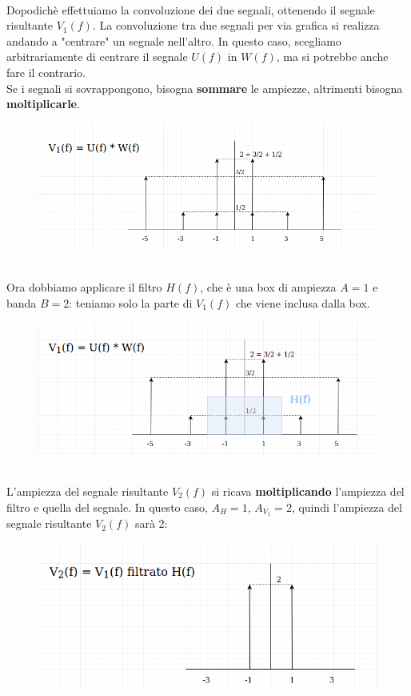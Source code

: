 \documentclass[12pt,a4paper]{article}
\begin{document}
	\\Dopodich\`e effettuiamo la convoluzione dei due segnali, ottenendo il segnale risultante $V_1(f)$. La convoluzione tra due segnali per via grafica si realizza andando a "centrare" un segnale nell'altro. In questo caso, scegliamo arbitrariamente di centrare il segnale $U(f)$ in $W(f)$, ma si potrebbe anche fare il contrario.\\Se i segnali si sovrappongono, bisogna \textbf{sommare} le ampiezze, altrimenti bisogna \textbf{moltiplicarle}.
	\begin{figure}[h!]
		\centering
		\includegraphics[scale=0.4]{./images/fourier53.png}
	\end{figure}
	\\Ora dobbiamo applicare il filtro $H(f)$, che \`e una box di ampiezza $A=1$ e banda $B=2$: teniamo solo la parte di $V_1(f)$ che viene inclusa dalla box.
	\begin{figure}[h!]
		\centering
		\includegraphics[scale=0.4]{./images/fourier54.png}
	\end{figure}
	\\L'ampiezza del segnale risultante $V_2(f)$ si ricava \textbf{moltiplicando} l'ampiezza del filtro e quella del segnale. In questo caso, $A_H = 1$, $A_{V_1} = 2$, quindi l'ampiezza del segnale risultante $V_2(f)$ sar\`a 2:
	\begin{figure}[h!]
		\centering
		\includegraphics[scale=0.4]{./images/fourier55.png}
	\end{figure}
\end{document}

